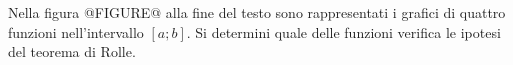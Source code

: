 Nella figura @FIGURE@ alla fine del testo sono rappresentati
i grafici di quattro funzioni nell’intervallo
$[a; b]$.
Si determini quale delle funzioni verifica le ipotesi del teorema di Rolle.

